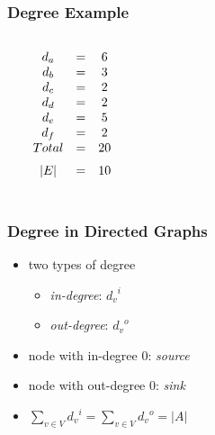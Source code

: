 \documentclass[dvipsnames]{beamer}
\begin{document}
\begin{frame}
  \frametitle{Degree Example}

  \begin{example}[multigraph]
    \begin{columns}
      \begin{center}
      \end{center}

      $\begin{array}{ccc}
      d_a & = & 6\\
      d_b & = & 3\\
      d_c & = & 2\\
      d_d & = & 2\\
      d_e & = & 5\\
      d_f & = & 2\\
      \medskip
      Total & = & 20\\
      \medskip
      |E| & = & 10
      \end{array}$
    \end{columns}
  \end{example}
\end{frame}

\begin{frame}
  \frametitle{Degree in Directed Graphs}

  \begin{itemize}
    \item two types of degree
    \begin{itemize}
      \item \emph{in-degree}: ${d_v}^i$
      \item \emph{out-degree}: ${d_v}^o$
    \end{itemize}

    \pause
    \medskip
    \item node with in-degree 0: \emph{source}
    \item node with out-degree  0: \emph{sink}

    \pause
    \bigskip
    \item $\sum_{v \in V} {d_v}^i = \sum_{v \in V} {d_v}^o = |A|$
  \end{itemize}
\end{frame}
\end{document}
